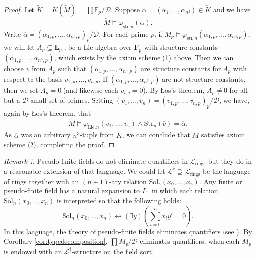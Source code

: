 \documentclass[psamsfonts]{amsart}
\theoremstyle{definition}
\theoremstyle{definition}
\theoremstyle{remark}
\newtheorem{rem}[thm]{Remark}
\numberwithin{equation}{section}
\newcommand\LL{\mathscr{L}}
\renewcommand{\models}{\vDash}
\begin{document}
\begin{proof}
 Let $\tilde{K} = K(\tilde{M}) = \prod \mathbb{F}_{p}/\mathcal{D}$. Suppose $\overline{\alpha} = (\alpha_{1},\ldots, \alpha_{n^{3}}) \in \tilde{K}$ and we have 
 $$
 \tilde{M} \models \varphi_{\mathrm{str},n}(\overline{\alpha}).
 $$
 Write $\overline{\alpha} = (\alpha_{1,p}, \ldots, \alpha_{n^{3},p})_{p}/\mathcal{D}$.  For each prime $p$, if $M_p\models \varphi_{\mathrm{str},n}(\alpha_{1,p}, \ldots, \alpha_{n^{3},p})$, we will let $A_{p} \subseteq \mathbf{L}_{p,c}$ be a Lie algebra over $\mathbf{F}_{p}$ with structure constants $(\alpha_{1,p}, \ldots, \alpha_{n^{3},p})$, which exists by the axiom scheme (1) above. Then we can choose $\overline{v}$ from $A_{p}$ such that $(\alpha_{1,p}, \ldots, \alpha_{n^{3},p})$ are structure constants for $A_{p}$ with respect to the basis $v_{1,p}, \ldots, v_{n,p}$.  If $(\alpha_{1,p}, \ldots, \alpha_{n^{3},p})$ are not structure constants, then we set $A_{p} = 0$ (and likewise each $v_{i,p} = 0$).  By {\L}os's theorem, $A_{p} \neq 0$ for all but a $\mathcal{D}$-small set of primes. Setting $(v_{1},\ldots, v_{n}) = (v_{1,p},\ldots, v_{n,p})_{p}/\mathcal{D}$, we have, again by {\L}os's theorem, that 
 $$
 \tilde{M} \models \varphi_{\mathrm{Lie},n}(v_{1},\ldots, v_{n}) \wedge \mathrm{Str}_{n}(\overline{v}) = \overline{\alpha}. 
 $$
 As $\overline{\alpha}$ was an arbitrary $n^{3}$-tuple from $\tilde{K}$, we can conclude that $\tilde{M}$ satisfies axiom scheme (2), completing the proof. 
\end{proof}

\begin{rem}
    Pseudo-finite fields do not eliminate quantifiers in $\LL_{\mathrm{rings}}$ but they do in a reasonable extension of that language.  We could let $\LL^{\dagger} \supseteq \LL_{\mathrm{rings}}$ be the language of rings together with an $(n+1)$-ary relation $\mathrm{Sol}_{n}(x_{0}, \ldots, x_{n})$.  Any finite or pseudo-finite field has a natural expansion to $L^{\dagger}$ in which each relation $\mathrm{Sol}_{n}(x_{0}, \ldots, x_{n})$ is interpreted so that the following holds:
$$
\mathrm{Sol}_{n}(x_{0},\ldots, x_{n}) \leftrightarrow (\exists y)\left(\sum_{i=0}^{n} x_{i}y^{i} = 0\right).
$$
In this language, the theory of pseudo-finite fields eliminates quantifiers (see \cite[Theorem 4.2]{chatzidakis2018notes}). By Corollary \ref{cor:typedecomposition}, $\prod M_{p}/\mathcal{D}$ eliminates quantifiers, when each $M_{p}$ is endowed with an $\LL^{\dagger}$-structure on the field sort. 
\end{rem}
\end{document}
